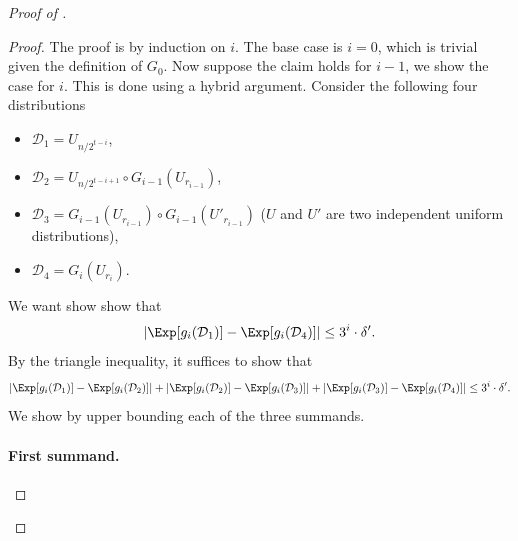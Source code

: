 \begin{proof}[Proof of ]
	    \begin{proof}\renewcommand{\qedsymbol}{$\square$ (\Cref{lem:prg-lc-claim-1})}
	    	The proof is by induction on $i$. The base case is $i=0$, which is trivial given the definition of $G_{0}$. Now suppose the claim holds for $i-1$, we show the case for $i$. This is done using a hybrid argument. Consider the following four distributions
	    	\begin{itemize}
	    		\item $\mathcal{D}_1=U_{n/2^{t-i}}$,
	    		\item $\mathcal{D}_2=U_{n/2^{t-i+1}}\circ G_{i-1}(U_{r_{i-1}})$,
	    		\item $\mathcal{D}_3=G_{i-1}(U_{r_{i-1}}) \circ G_{i-1}(U'_{r_{i-1}})$ ($U$ and $U'$ are two independent uniform distributions),
	    		\item $\mathcal{D}_4=G_i(U_{r_i})$.
	    	\end{itemize}
	    	We want show show that
	    	\[
	    		\left|\Exp[g_i(\mathcal{D}_1)]-\Exp[g_i(\mathcal{D}_4)]\right|\leq 3^{i}\cdot \delta'.
	    	\]
	    	By the triangle inequality, it suffices to show that
	    	\begin{equation}\label{eq:prg-lc-triangle}
	    		\left|\Exp[g_i(\mathcal{D}_1)]-\Exp[g_i(\mathcal{D}_2)]\right| + \left|\Exp[g_i(\mathcal{D}_2)]-\Exp[g_i(\mathcal{D}_3)]\right| + \left|\Exp[g_i(\mathcal{D}_3)]-\Exp[g_i(\mathcal{D}_4)]\right| \leq  3^{i}\cdot \delta'.
	    	\end{equation}
	    	We show  by upper bounding each of the three summands.
	    	
	    	\paragraph{First summand.}
	    	

\end{proof}
\end{proof}
